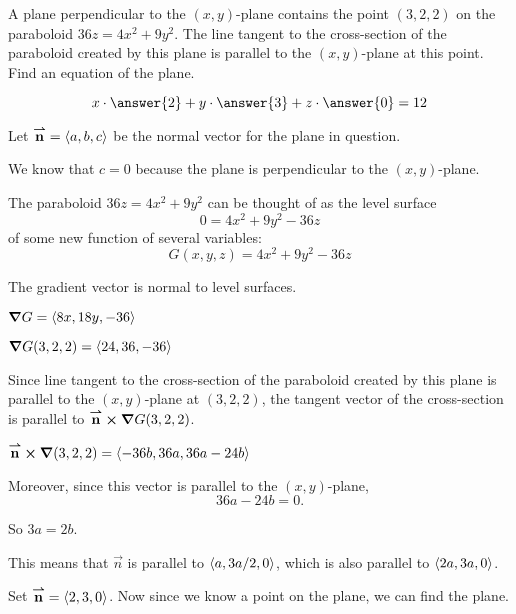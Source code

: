 \documentclass{ximera}
\author{David Guichard \and Neal Koblitz \and H. Jerome Keisler \and Albert Scheller \and Barry Balof \and Mike Wills \and Matthew Carr}
\begin{document}
\begin{exercise}
A plane perpendicular to the $(x,y)$-plane contains the point
$(3,2,2)$ on the paraboloid $36z=4x^2+9y^2$. The line tangent to the
cross-section of the paraboloid created by this plane is parallel to
the $(x,y)$-plane at this point. Find an equation of the plane.
\begin{prompt}
\[
x\cdot \answer{2} + y \cdot \answer{3} + z \cdot \answer{0} = 12
\]
\end{prompt}

\begin{hint}
  Let ${\overset{\boldsymbol{\rightharpoonup}}{\mathbf{n}}}=\left\langle a,b,c\right\rangle$ be the normal vector for the plane in
  question.
\end{hint}

\begin{hint}
  We know that $c=0$ because the plane is perpendicular to the
  $(x,y)$-plane.
\end{hint}

\begin{hint}
  The paraboloid $36z=4x^2+9y^2$ can be thought of as the level surface
  \[
  0 =4x^2+9y^2-36z
  \]
  of some new function of several variables:
  \[
  G(x,y,z) = 4x^2+9y^2-36z
  \]
\end{hint}

\begin{hint}
  The gradient vector is normal to level surfaces.
\end{hint}


\begin{hint}
  $\boldsymbol\nabla G = \left\langle 8x,18y,-36\right\rangle$
\end{hint}

\begin{hint}
  $\boldsymbol\nabla G(3,2,2) = \left\langle 24,36,-36\right\rangle$
\end{hint}

\begin{hint}
  Since line tangent to the cross-section of the paraboloid created by
  this plane is parallel to the $(x,y)$-plane at $(3,2,2)$, the
  tangent vector of the cross-section is parallel to
  ${\overset{\boldsymbol{\rightharpoonup}}{\mathbf{n}}}\boldsymbol\times\boldsymbol\nabla G(3,2,2)$.
\end{hint}

\begin{hint}
  ${\overset{\boldsymbol{\rightharpoonup}}{\mathbf{n}}}\boldsymbol\times\boldsymbol\nabla(3,2,2) = \left\langle -36b,36a,36a-24b\right\rangle$
\end{hint}

\begin{hint}
  Moreover, since this vector is parallel to the $(x,y)$-plane,
  \[
  36a-24b = 0.
  \]
\end{hint}

\begin{hint}
  So $3a=2b$.
\end{hint}

\begin{hint}
  This means that $\vec{n}$ is parallel to $\left\langle a,3a/2,0\right\rangle$, which
  is also parallel to $\left\langle 2a,3a,0\right\rangle$.
\end{hint}

\begin{hint}
  Set ${\overset{\boldsymbol{\rightharpoonup}}{\mathbf{n}}}= \left\langle 2,3,0\right\rangle$. Now since we know a point on the
  plane, we can find the plane.
\end{hint}

\end{exercise}
\end{document}
